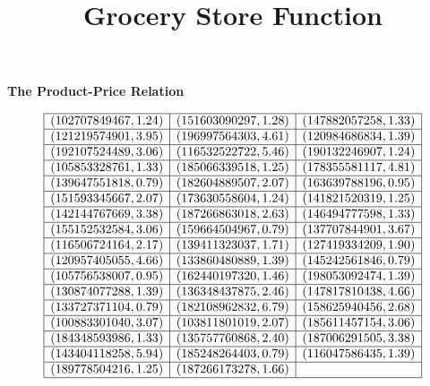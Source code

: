 \documentclass{ximera}
\title{Grocery Store Function}
\begin{document}
\begin{abstract}
\end{abstract}

\maketitle

\textbf{The Product-Price Relation}



\[
\begin{array}{|l|l|l|}
\hline
(102707849467, 1.24) & (151603090297, 1.28) & (147882057258, 1.33) \\\hline
(121219574901, 3.95) & (196997564303, 4.61) & (120984686834, 1.39) \\\hline
(192107524489, 3.06) & (116532522722, 5.46) & (190132246907, 1.24) \\\hline
(105853328761, 1.33) & (185066339518, 1.25) & (178355581117, 4.81) \\\hline 
(139647551818, 0.79) & (182604889507, 2.07) & (163639788196, 0.95) \\\hline 
(151593345667, 2.07) & (173630558604, 1.24) & (141821520319, 1.25) \\\hline 
(142144767669, 3.38) & (187266863018, 2.63) & (146494777598, 1.33) \\\hline 
(155152532584, 3.06) & (159664504967, 0.79) & (137707844901, 3.67) \\\hline 
(116506724164, 2.17) & (139411323037, 1.71) & (127419334209, 1.90) \\\hline 
(120957405055, 4.66) & (133860480889, 1.39) & (145242561846, 0.79) \\\hline 
(105756538007, 0.95) & (162440197320, 1.46) & (198053092474, 1.39) \\\hline 
(130874077288, 1.39) & (136348437875, 2.46) & (147817810438, 4.66) \\\hline 
(133727371104, 0.79) & (182108962832, 6.79) & (158625940456, 2.68) \\\hline 
(100883301040, 3.07) & (103811801019, 2.07) & (185611457154, 3.06) \\\hline 
(184348593986, 1.33) & (135757760868, 2.40) & (187006291505, 3.38) \\\hline 
(143404118258, 5.94) & (185248264403, 0.79) & (116047586435, 1.39) \\\hline 
(189778504216, 1.25) & (187266173278, 1.66) &    \\\hline
\end{array}
\]
\end{document}
